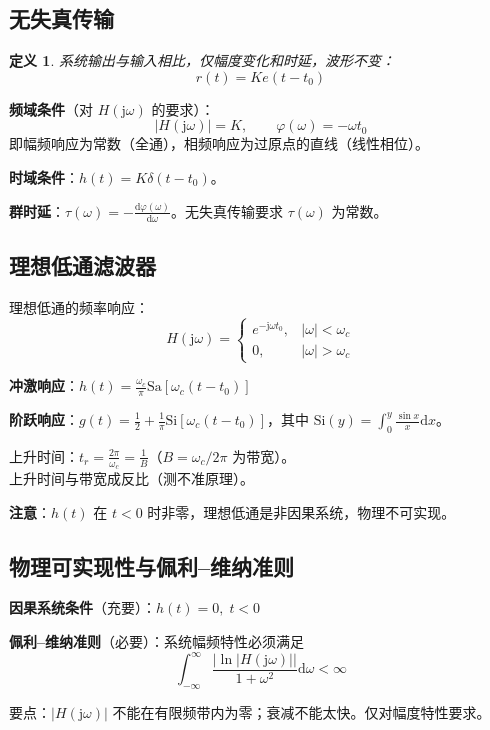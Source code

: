 \documentclass[11pt,a4paper]{ctexart}
\newtheorem{definition}{定义}[section]
\newcommand{\jj}{\mathrm{j}}            %
\newcommand{\dd}{\mathrm{d}}            %
\newcommand{\Sa}{\mathrm{Sa}}           %
\newcommand{\dirac}{\delta}             %
\begin{document}
\subsection{无失真传输}

\begin{definition}
系统输出与输入相比，仅幅度变化和时延，波形不变：
\[
r(t) = K e(t - t_0)
\]
\end{definition}

\textbf{频域条件}（对 $H(\jj\omega)$ 的要求）：
\[
\boxed{|H(\jj\omega)| = K},\qquad \boxed{\varphi(\omega) = -\omega t_0}
\]
即幅频响应为常数（全通），相频响应为过原点的直线（线性相位）。

\textbf{时域条件}：$h(t) = K\dirac(t - t_0)$。

\textbf{群时延}：$\tau(\omega) = -\frac{\dd\varphi(\omega)}{\dd\omega}$。无失真传输要求 $\tau(\omega)$ 为常数。

\subsection{理想低通滤波器}

理想低通的频率响应：
\[
H(\jj\omega) = \begin{cases}
e^{-\jj\omega t_0}, & |\omega| < \omega_c \\
0, & |\omega| > \omega_c
\end{cases}
\]

\textbf{冲激响应}：$h(t) = \frac{\omega_c}{\pi}\Sa[\omega_c(t - t_0)]$

\textbf{阶跃响应}：$g(t) = \frac{1}{2} + \frac{1}{\pi}\mathrm{Si}[\omega_c(t - t_0)]$，其中 $\mathrm{Si}(y) = \int_0^y \frac{\sin x}{x}\dd x$。

上升时间：$t_r = \frac{2\pi}{\omega_c} = \frac{1}{B}$（$B = \omega_c/2\pi$ 为带宽）。\\
上升时间与带宽成反比（测不准原理）。

\textbf{注意}：$h(t)$ 在 $t < 0$ 时非零，理想低通是非因果系统，物理不可实现。

\subsection{物理可实现性与佩利--维纳准则}

\textbf{因果系统条件}（充要）：$h(t) = 0,\; t < 0$

\textbf{佩利--维纳准则}（必要）：系统幅频特性必须满足
\[
\int_{-\infty}^{\infty} \frac{|\ln|H(\jj\omega)||}{1 + \omega^2}\dd\omega < \infty
\]

要点：$|H(\jj\omega)|$ 不能在有限频带内为零；衰减不能太快。仅对幅度特性要求。
\end{document}
